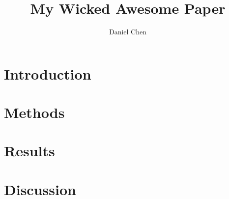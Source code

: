 \documentclass[10pt,letterpaper,twocolumn]{article}
\author{Daniel Chen}
\title{My Wicked Awesome Paper}
\begin{document}
	
	\maketitle
	
	\section{Introduction}
	
	
	
	\section{Methods}
	
	
	
	\section{Results}
	
	
	
	\section{Discussion}
	
	
	
\end{document}
